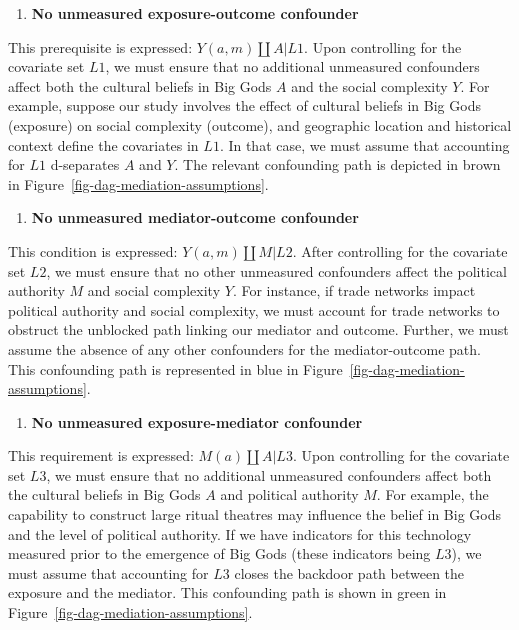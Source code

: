 \documentclass[
  singlecolumn,
  9pt]{article}
\providecommand{\tightlist}{%
  \setlength{\itemsep}{0pt}\setlength{\parskip}{0pt}}\usepackage{longtable,booktabs,array}
\begin{document}
\begin{enumerate}
\def\labelenumi{\arabic{enumi}.}
\tightlist
\item
  \textbf{No unmeasured exposure-outcome confounder}
\end{enumerate}

This prerequisite is expressed: \(Y(a,m) \coprod A | L1\). Upon
controlling for the covariate set \(L1\), we must ensure that no
additional unmeasured confounders affect both the cultural beliefs in
Big Gods \(A\) and the social complexity \(Y\). For example, suppose our
study involves the effect of cultural beliefs in Big Gods (exposure) on
social complexity (outcome), and geographic location and historical
context define the covariates in \(L1\). In that case, we must assume
that accounting for \(L1\) d-separates \(A\) and \(Y\). The relevant
confounding path is depicted in brown in
Figure~\ref{fig-dag-mediation-assumptions}.

\begin{enumerate}
\def\labelenumi{\arabic{enumi}.}
\setcounter{enumi}{1}
\tightlist
\item
  \textbf{No unmeasured mediator-outcome confounder}
\end{enumerate}

This condition is expressed: \(Y(a,m) \coprod M | L2\). After
controlling for the covariate set \(L2\), we must ensure that no other
unmeasured confounders affect the political authority \(M\) and social
complexity \(Y\). For instance, if trade networks impact political
authority and social complexity, we must account for trade networks to
obstruct the unblocked path linking our mediator and outcome. Further,
we must assume the absence of any other confounders for the
mediator-outcome path. This confounding path is represented in blue in
Figure~\ref{fig-dag-mediation-assumptions}.

\begin{enumerate}
\def\labelenumi{\arabic{enumi}.}
\setcounter{enumi}{2}
\tightlist
\item
  \textbf{No unmeasured exposure-mediator confounder}
\end{enumerate}

This requirement is expressed: \(M(a) \coprod A | L3\). Upon controlling
for the covariate set \(L3\), we must ensure that no additional
unmeasured confounders affect both the cultural beliefs in Big Gods
\(A\) and political authority \(M\). For example, the capability to
construct large ritual theatres may influence the belief in Big Gods and
the level of political authority. If we have indicators for this
technology measured prior to the emergence of Big Gods (these indicators
being \(L3\)), we must assume that accounting for \(L3\) closes the
backdoor path between the exposure and the mediator. This confounding
path is shown in green in Figure~\ref{fig-dag-mediation-assumptions}.
\end{document}
